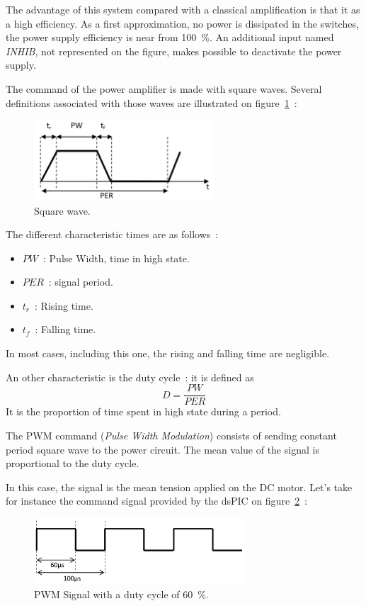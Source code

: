 \documentclass[11pt,a4paper]{article}
\theoremstyle{definition}%
\begin{document}
The advantage of this system compared with a classical amplification is that it as a high efficiency.
As a first approximation, no power is dissipated in the switches, the power supply efficiency is near from 100~\%.
An additional input named \textit{INHIB}, not represented on the figure, makes possible to deactivate the power supply.

The command of the power amplifier is made with square waves.
Several definitions associated with those waves are illustrated on figure~\ref{fig:square-wave}~:
\begin{figure}[H]
\center
\includegraphics[width=0.6\textwidth]{square-wave}
\caption{Square wave.}
\label{fig:square-wave}
\end{figure}

The different characteristic times are as follows~:
\begin{itemize}
	\item $PW$~: Pulse Width, time in high state.
	\item $PER$~: signal period.
	\item $t_r$~: Rising time.
	\item $t_f$~: Falling time.
\end{itemize}

In most cases, including this one, the rising and falling time are negligible.

An other characteristic is the duty cycle~: it is defined as \[D = \frac{PW}{PER}\]
It is the proportion of time spent in high state during a period.

The PWM command (\textit{Pulse Width Modulation}) consists of sending constant period square wave to the power circuit.
The mean value of the signal is proportional to the duty cycle.

In this case, the signal is the mean tension applied on the DC motor.
Let's take for instance the command signal provided by the dsPIC on figure~\ref{fig:pwm}~:
\begin{figure}[H]
\center
\includegraphics[width=0.7\textwidth]{pwm}
\caption{PWM Signal with a duty cycle of 60~\%.}
\label{fig:pwm}
\end{figure}
\end{document}
